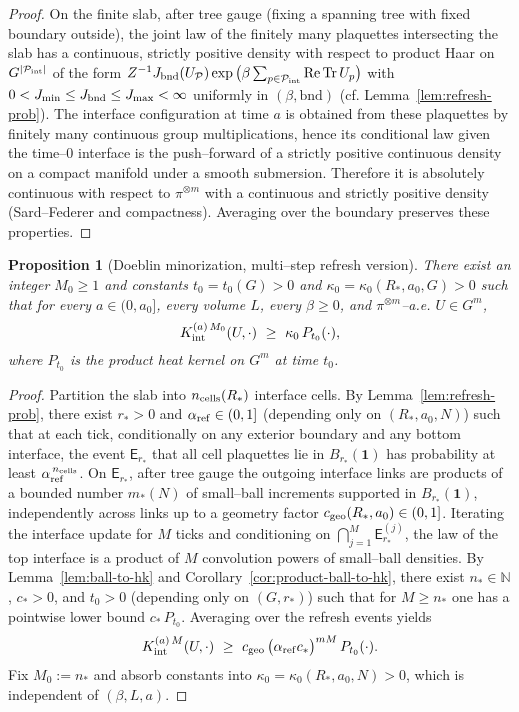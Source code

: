 \documentclass[11pt]{amsart}
\theoremstyle{plain}
\newtheorem{proposition}[theorem]{Proposition}
\theoremstyle{definition}
\theoremstyle{remark}
\begin{document}
\begin{proof}
On the finite slab, after tree gauge (fixing a spanning tree with fixed boundary outside), the joint law of the finitely many plaquettes intersecting the slab has a continuous, strictly positive density with respect to product Haar on $G^{|\mathcal P_{\rm int}|}$ of the form $Z^{-1} J_{\rm bnd}(U_{\mathcal P})\exp\big(\beta \sum_{p\in\mathcal P_{\rm int}} \mathrm{Re\,Tr}\,U_p\big)$ with $0<J_{\min}\le J_{\rm bnd}\le J_{\max}<\infty$ uniformly in $(\beta,\text{bnd})$ (cf. Lemma~\ref{lem:refresh-prob}). The interface configuration at time $a$ is obtained from these plaquettes by finitely many continuous group multiplications, hence its conditional law given the time–$0$ interface is the push–forward of a strictly positive continuous density on a compact manifold under a smooth submersion. Therefore it is absolutely continuous with respect to $\pi^{\otimes m}$ with a continuous and strictly positive density (Sard–Federer and compactness). Averaging over the boundary preserves these properties.
\end{proof}

\begin{proposition}[Doeblin minorization, multi--step refresh version]\label{prop:doeblin-full}
There exist an integer $M_0\ge 1$ and constants $t_0=t_0(G)>0$ and $\kappa_0=\kappa_0(R_*,a_0,G)>0$ such that for every $a\in(0,a_0]$, every volume $L$, every $\beta\ge 0$, and $\pi^{\otimes m}$–a.e. $U\in G^m$,
\[
  K_{\rm int}^{(a)\,M_0}(U,\cdot)\ \ge\ \kappa_0\, P_{t_0}(\cdot),
\]
where $P_{t_0}$ is the product heat kernel on $G^m$ at time $t_0$.
\end{proposition}
\begin{proof}
Partition the slab into $n_{\rm cells}(R_*)$ interface cells. By Lemma~\ref{lem:refresh-prob}, there exist $r_*>0$ and $\alpha_{\rm ref}\in(0,1]$ (depending only on $(R_*,a_0,N)$) such that at each tick, conditionally on any exterior boundary and any bottom interface, the event $\mathsf E_{r_*}$ that all cell plaquettes lie in $B_{r_*}(\mathbf 1)$ has probability at least $\alpha_{\rm ref}^{\,n_{\rm cells}}$. On $\mathsf E_{r_*}$, after tree gauge the outgoing interface links are products of a bounded number $m_*(N)$ of small--ball increments supported in $B_{r_*}(\mathbf 1)$, independently across links up to a geometry factor $c_{\rm geo}(R_*,a_0)\in(0,1]$. Iterating the interface update for $M$ ticks and conditioning on $\bigcap_{j=1}^M \mathsf E_{r_*}^{(j)}$, the law of the top interface is a product of $M$ convolution powers of small--ball densities. By Lemma~\ref{lem:ball-to-hk} and Corollary~\ref{cor:product-ball-to-hk}, there exist $n_*\in\mathbb N$, $c_*>0$, and $t_0>0$ (depending only on $(G,r_*)$) such that for $M\ge n_*$ one has a pointwise lower bound $c_*\,P_{t_0}$. Averaging over the refresh events yields
\[
  K_{\rm int}^{(a)\,M}(U,\cdot)\ \ge\ c_{\rm geo}\,\big(\alpha_{\rm ref} c_*\big)^{m M}\, P_{t_0}(\cdot).
\]
Fix $M_0:=n_*$ and absorb constants into $\kappa_0=\kappa_0(R_*,a_0,N)>0$, which is independent of $(\beta,L,a)$. 
\end{proof}
\end{document}

